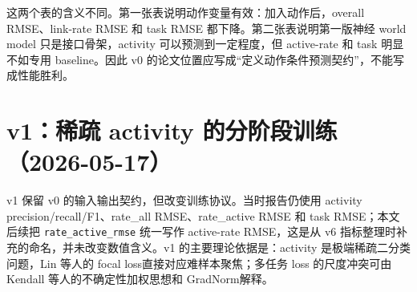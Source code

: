 \documentclass[UTF8,a4paper,11pt]{ctexart}
\newcommand{\code}[1]{\texttt{#1}}
\begin{document}
\begin{table}[H]
\centering
\small
{}
\caption{v0 神经 world model 与专用 baseline 的 test seed 4 对照，来源为 \code{world\_model\_v0\_report.md}。}
\end{table}

这两个表的含义不同。第一张表说明动作变量有效：加入动作后，overall RMSE、link-rate RMSE 和 task RMSE 都下降。第二张表说明第一版神经 world model 只是接口骨架，activity 可以预测到一定程度，但 active-rate 和 task 明显不如专用 baseline。因此 v0 的论文位置应写成“定义动作条件预测契约”，不能写成性能胜利。

\section{v1：稀疏 activity 的分阶段训练（2026-05-17）}

v1 保留 v0 的输入输出契约，但改变训练协议。当时报告仍使用 activity precision/recall/F1、rate\_all RMSE、rate\_active RMSE 和 task RMSE；本文后续把 \code{rate\_active\_rmse} 统一写作 active-rate RMSE，这是从 v6 指标整理时补充的命名，并未改变数值含义。v1 的主要理论依据是：activity 是极端稀疏二分类问题，Lin 等人的 focal loss直接对应难样本聚焦；多任务 loss 的尺度冲突可由 Kendall 等人的不确定性加权思想和 GradNorm解释。

\begin{table}[H]
\centering
\small
{}
\caption{v1 staged training 与 v0 的 test seed 4 对比，来源为 \code{world\_model\_v1\_staged\_report.md}。}
\end{table}
\end{document}
